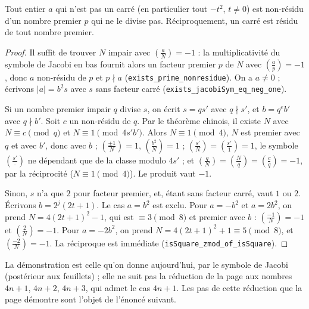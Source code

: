 \begin{enonce}
Tout entier $a$ qui n'est pas un carré (en particulier tout $-t^2$, $t \neq 0$) est non-résidu d'un nombre premier $p$ qui ne le divise pas. Réciproquement, un carré est résidu de tout nombre premier.
\end{enonce}

\begin{proof}
Il suffit de trouver $N$ impair avec $\left(\frac{a}{N}\right) = -1$ : la multiplicativité du symbole de Jacobi en bas fournit alors un facteur premier $p$ de $N$ avec $\left(\frac{a}{p}\right) = -1$, donc $a$ non-résidu de $p$ et $p \nmid a$ (\texttt{exists\_prime\_nonresidue}). On a $a \neq 0$ ; écrivons $|a| = b^2 s$ avec $s$ sans facteur carré (\texttt{exists\_jacobiSym\_eq\_neg\_one}).

Si un nombre premier impair $q$ divise $s$, on écrit $s = qs'$ avec $q \nmid s'$, et $b = q^e b'$ avec $q \nmid b'$. Soit $c$ un non-résidu de $q$. Par le théorème chinois, il existe $N$ avec $N \equiv c \pmod q$ et $N \equiv 1 \pmod{4s'b'}$. Alors $N \equiv 1 \pmod 4$, $N$ est premier avec $q$ et avec $b'$, donc avec $b$ ; $\left(\frac{\pm1}{N}\right) = 1$, $\left(\frac{b^2}{N}\right) = 1$ ; $\left(\frac{s'}{N}\right) = \left(\frac{s'}{1}\right) = 1$, le symbole $\left(\frac{s'}{\cdot}\right)$ ne dépendant que de la classe modulo $4s'$ ; et $\left(\frac{q}{N}\right) = \left(\frac{N}{q}\right) = \left(\frac{c}{q}\right) = -1$, par la réciprocité ($N \equiv 1 \pmod 4$). Le produit vaut $-1$.

Sinon, $s$ n'a que $2$ pour facteur premier, et, étant sans facteur carré, vaut $1$ ou $2$. Écrivons $b = 2^j(2t+1)$. Le cas $a = b^2$ est exclu. Pour $a = -b^2$ et $a = 2b^2$, on prend $N = 4(2t+1)^2 - 1$, qui est $\equiv 3 \pmod 8$ et premier avec $b$ : $\left(\frac{-1}{N}\right) = -1$ et $\left(\frac{2}{N}\right) = -1$. Pour $a = -2b^2$, on prend $N = 4(2t+1)^2 + 1 \equiv 5 \pmod 8$, et $\left(\frac{-2}{N}\right) = -1$. La réciproque est immédiate (\texttt{isSquare\_zmod\_of\_isSquare}).
\end{proof}

\begin{remarque}
La démonstration est celle qu'on donne aujourd'hui, par le symbole de Jacobi (postérieur aux feuillets) ; elle ne suit pas la réduction de la page aux nombres $4n+1$, $4n+2$, $4n+3$, qui admet le cas $4n+1$. Les pas de cette réduction que la page démontre sont l'objet de l'énoncé suivant.
\end{remarque}

